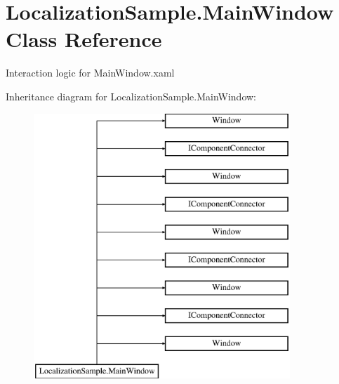 \hypertarget{class_localization_sample_1_1_main_window}{}\section{Localization\+Sample.\+Main\+Window Class Reference}
\label{class_localization_sample_1_1_main_window}


Interaction logic for Main\+Window.\+xaml  


Inheritance diagram for Localization\+Sample.\+Main\+Window\+:\begin{figure}[H]
\begin{center}
\leavevmode
\includegraphics[height=10.000000cm]{d6/d6f/class_localization_sample_1_1_main_window}
\end{center}
\end{figure}

